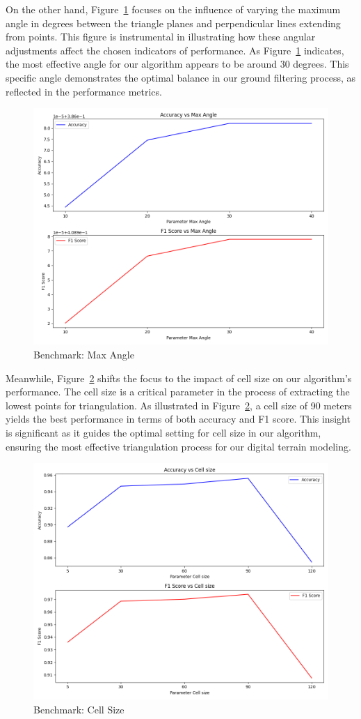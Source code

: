 \documentclass{article}
\begin{document}
\noindent On the other hand, Figure~\ref{fig5} focuses on the influence of varying the maximum angle in degrees between the triangle planes and perpendicular lines extending from points. This figure is instrumental in illustrating how these angular adjustments affect the chosen indicators of performance. As Figure~\ref{fig5} indicates, the most effective angle for our algorithm appears to be around 30 degrees. This specific angle demonstrates the optimal balance in our ground filtering process, as reflected in the performance metrics.\\

\begin{figure}[hbt!]
    \centering
    \includegraphics[width=0.6\linewidth]{Figures/benchmark_Max Angle.png}
    \caption{Benchmark: Max Angle}
    \label{fig5}
\end{figure}


\noindent Meanwhile, Figure~\ref{fig6} shifts the focus to the impact of cell size on our algorithm's performance. The cell size is a critical parameter in the process of extracting the lowest points for triangulation. As illustrated in Figure~\ref{fig6}, a cell size of 90 meters yields the best performance in terms of both accuracy and F1 score. This insight is significant as it guides the optimal setting for cell size in our algorithm, ensuring the most effective triangulation process for our digital terrain modeling.\\


\begin{figure}[hbt!]
    \centering
    \includegraphics[width=0.6\linewidth]{Figures/benchmark_Cell size.png}
    \caption{Benchmark: Cell Size}
    \label{fig6}
\end{figure}
\end{document}
